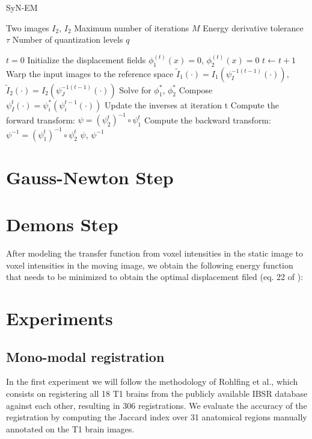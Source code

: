 \documentclass[11pt]{article}
\begin{document}
\begin{algorithm}[h!]
\caption{SyN-EM}\label{alg:SyNEM}
\begin{algorithmic}[1]
\REQUIRE Two images $I_{2}$, $I_{2}$
\REQUIRE Maximum number of iterations $M$
\REQUIRE Energy derivative tolerance $\tau$
\REQUIRE Number of quantization levels $q$

\medskip
\STATE $t = 0$
\STATE Initialize the displacement fields $\phi_{1}^{(t)}(x) = 0$, $\phi_{2}^{(t)}(x) = 0$
\REPEAT
    \STATE $t \leftarrow t+1$
    \STATE Warp the input images to the reference space $\tilde{I}_{1}(\cdot) = I_{1}(\psi_{I}^{-1(t-1)}(\cdot))$, $\tilde{I}_{2}(\cdot) = I_{2}(\psi_{J}^{-1(t-1)}(\cdot))$
    \STATE Solve for $\phi_{1}^{*}$, $\phi_{2}^{*}$
    \STATE Compose $\psi_{I}^{t}(\cdot) = \psi_{i}^{*}(\psi_{i}^{t-1}(\cdot))$
    \STATE Update the inverses at iteration t
\STATE Compute the forward transform: $\psi = (\psi_{2}^{t})^{-1} \circ \psi_{1}^{t}$
\STATE Compute the backward transform: $\psi^{-1} = (\psi_{1}^{t})^{-1} \circ \psi_{2}^{t}$
\RETURN $\psi$, $\psi^{-1}$
\end{algorithmic}
\end{algorithm}


\section{Gauss-Newton Step}

\section{Demons Step}
After modeling the transfer function from voxel intensities in the static image to voxel intensities in the moving image, we obtain the following energy function that needs to be minimized to obtain the optimal displacement filed (eq. 22 of \cite{Arce-santana2014}):

\section{Experiments}
\subsection{Mono-modal registration}

In the first experiment we will follow the methodology of Rohlfing et al.\cite{Rohlfing2012}, which consists on registering all 18 T1 brains from the publicly available IBSR database against each other, resulting in 306 registrations. We evaluate the accuracy of the registration by computing the Jaccard index over 31 anatomical regions manually annotated on the T1 brain images.
\end{document}
